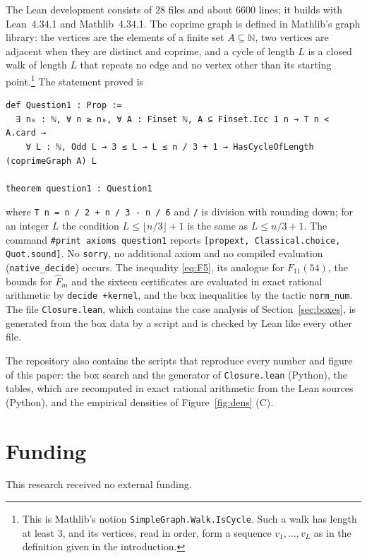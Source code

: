 \documentclass[11pt,a4paper]{article}
\theoremstyle{definition}
\theoremstyle{remark}
\begin{document}
The Lean development consists of $28$ files and about $6600$ lines; it builds with Lean~4.34.1 and
Mathlib~4.34.1. The coprime graph is defined in Mathlib's graph library: the vertices are the
elements of a finite set $A\subseteq\mathbb{N}$, two vertices are adjacent when they are distinct and
coprime, and a cycle of length $L$ is a closed walk of length $L$ that repeats no edge and no vertex
other than its starting point.\footnote{This is Mathlib's notion \texttt{SimpleGraph.Walk.IsCycle}.
Such a walk has length at least $3$, and its vertices, read in order, form a sequence
$v_1,\dots,v_L$ as in the definition given in the introduction.}
The statement proved is
\par\noindent\begin{minipage}{\linewidth}
\begin{lstlisting}[style=lean]
def Question1 : Prop :=
  ∃ n₀ : ℕ, ∀ n ≥ n₀, ∀ A : Finset ℕ, A ⊆ Finset.Icc 1 n → T n < A.card →
    ∀ L : ℕ, Odd L → 3 ≤ L → L ≤ n / 3 + 1 → HasCycleOfLength (coprimeGraph A) L

theorem question1 : Question1
\end{lstlisting}
\end{minipage}
\par\noindent where \texttt{T n = n / 2 + n / 3 - n / 6} and \texttt{/} is division with rounding down; for an
integer $L$ the condition $L\le\lfloor n/3\rfloor+1$ is the same as $L\le n/3+1$. The command
\texttt{\#print axioms question1} reports \texttt{[propext, Classical.choice, Quot.sound]}. No
\texttt{sorry}, no additional axiom and no compiled evaluation (\texttt{native\_decide}) occurs. The
inequality \eqref{eq:F5}, its analogue for $F_{11}(54)$, the bounds for $\hat F_m$ and the sixteen
certificates are evaluated in exact rational arithmetic by \texttt{decide +kernel}, and the box
inequalities by the tactic \texttt{norm\_num}. The file \texttt{Closure.lean}, which contains the case
analysis of Section~\ref{sec:boxes}, is generated from the box data by a script and is checked by Lean
like every other file.

The repository also contains the scripts that reproduce every number and figure of this paper: the
box search and the generator of \texttt{Closure.lean} (Python), the tables, which are recomputed in
exact rational arithmetic from the Lean sources (Python), and the empirical densities of
Figure~\ref{fig:dens} (C).

\section*{Funding}
This research received no external funding.
\end{document}
